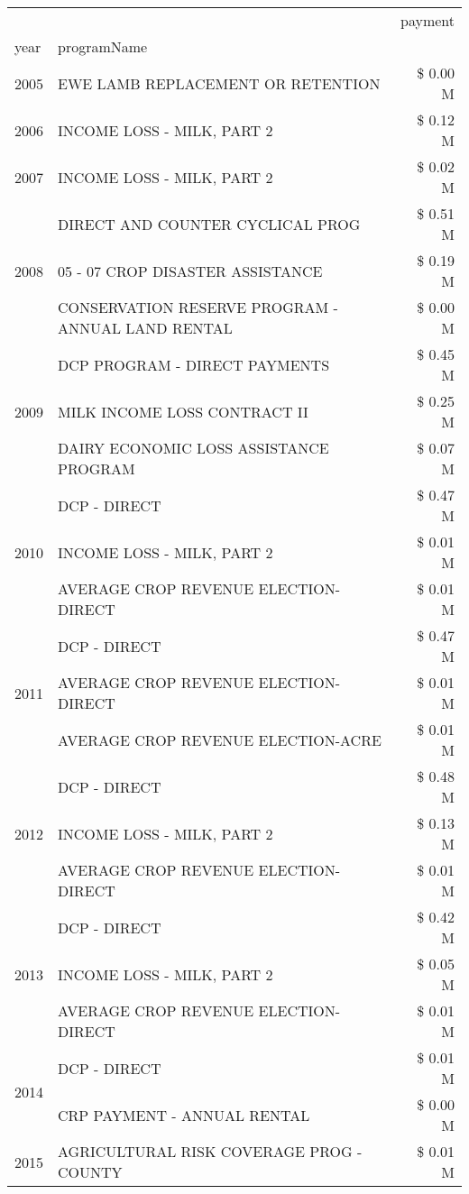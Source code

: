 \begin{tabular}{llr}
\toprule
 &  & payment \\
year & programName &  \\
\midrule
2005 & EWE LAMB REPLACEMENT OR RETENTION & \$ 0.00 M \\
\cline{1-3}
2006 & INCOME LOSS - MILK, PART 2 & \$ 0.12 M \\
\cline{1-3}
2007 & INCOME LOSS - MILK, PART 2 & \$ 0.02 M \\
\cline{1-3}
\multirow[t]{3}{*}{2008} & DIRECT AND COUNTER CYCLICAL PROG & \$ 0.51 M \\
 & 05 - 07 CROP DISASTER ASSISTANCE & \$ 0.19 M \\
 & CONSERVATION RESERVE PROGRAM - ANNUAL LAND RENTAL & \$ 0.00 M \\
\cline{1-3}
\multirow[t]{3}{*}{2009} & DCP PROGRAM - DIRECT PAYMENTS & \$ 0.45 M \\
 & MILK INCOME LOSS CONTRACT II & \$ 0.25 M \\
 & DAIRY ECONOMIC LOSS ASSISTANCE PROGRAM & \$ 0.07 M \\
\cline{1-3}
\multirow[t]{3}{*}{2010} & DCP - DIRECT & \$ 0.47 M \\
 & INCOME LOSS - MILK, PART 2 & \$ 0.01 M \\
 & AVERAGE CROP REVENUE ELECTION-DIRECT & \$ 0.01 M \\
\cline{1-3}
\multirow[t]{3}{*}{2011} & DCP - DIRECT & \$ 0.47 M \\
 & AVERAGE CROP REVENUE ELECTION-DIRECT & \$ 0.01 M \\
 & AVERAGE CROP REVENUE ELECTION-ACRE & \$ 0.01 M \\
\cline{1-3}
\multirow[t]{3}{*}{2012} & DCP - DIRECT & \$ 0.48 M \\
 & INCOME LOSS - MILK, PART 2 & \$ 0.13 M \\
 & AVERAGE CROP REVENUE ELECTION-DIRECT & \$ 0.01 M \\
\cline{1-3}
\multirow[t]{3}{*}{2013} & DCP - DIRECT & \$ 0.42 M \\
 & INCOME LOSS - MILK, PART 2 & \$ 0.05 M \\
 & AVERAGE CROP REVENUE ELECTION-DIRECT & \$ 0.01 M \\
\cline{1-3}
\multirow[t]{2}{*}{2014} & DCP - DIRECT & \$ 0.01 M \\
 & CRP PAYMENT - ANNUAL RENTAL & \$ 0.00 M \\
\cline{1-3}
\multirow[t]{2}{*}{2015} & AGRICULTURAL RISK COVERAGE PROG - COUNTY & \$ 0.01 M \\

\end{tabular}
